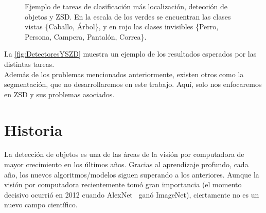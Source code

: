 \begin{figure}[]
  \centering
  \caption{Ejemplo de tareas de clasificación más localización, detección de objetos y ZSD. En la escala de los verdes se encuentran las clases vistas \{Caballo, Árbol\}, y en rojo las clases invisibles \{Perro, Persona, Campera, Pantalón, Correa\}.}
  \label{fig:DetectoresYSZD}
\end{figure}

La \autoref{fig:DetectoresYSZD} muestra un ejemplo de los resultados esperados por las distintas tareas.\\

Además de los problemas mencionados anteriormente, existen otros como la segmentación, que no desarrollaremos en este trabajo. Aquí, solo nos enfocaremos en ZSD y sus problemas asociados.

\section{Historia} \label{sec:historia}
La detección de objetos es una de las áreas de la visión por computadora de mayor crecimiento en los últimos años. Gracias al aprendizaje profundo, cada año, los nuevos algoritmos/modelos siguen superando a los anteriores. Aunque la visión por computadora recientemente tomó gran importancia (el momento decisivo ocurrió en 2012 cuando AlexNet~\cite{krizhevsky2012imagenet} ganó ImageNet), ciertamente no es un nuevo campo científico.\\

